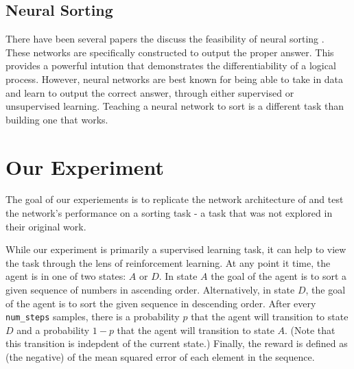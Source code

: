 \documentclass{article}
\begin{document}



\subsection{Neural Sorting}
There have been several papers the discuss the feasibility of neural sorting
\cite{sort1, sort2}. These networks are specifically constructed
to output the proper answer. This provides a powerful intution that demonstrates
the differentiability of a logical process. However, neural networks are
best known for being able to take in data and learn to output the correct answer,
through either supervised or unsupervised learning. Teaching a neural network
to sort is a different task than building one that works.



\section{Our Experiment}
The goal of our experiements is to replicate the network architecture of \cite{Miconi18}
and test the network's performance on a sorting task - a task that was not explored in their
original work.

While our experiment is primarily a supervised learning task, it can help to view the task
through the lens of reinforcement learning. At any point it time, the agent is in one of two
states: $A$ or $D$. In state $A$ the goal of the agent is to sort a given sequence of numbers
in ascending order. Alternatively, in state $D$, the goal of the agent is to sort the given
sequence in descending order. After every \texttt{num\_steps} samples, there is a probability $p$
that the agent will transition to state $D$ and a probability $1-p$ that the agent will transition to
state $A$. (Note that this transition is indepdent of the current state.) Finally, the reward is defined
as (the negative) of the mean squared error of each element in the sequence.
\end{document}
